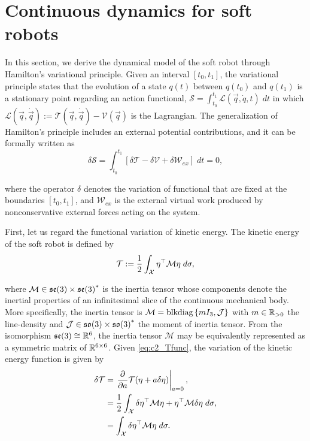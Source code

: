 \section*{Continuous dynamics for soft robots}
In this section, we derive the dynamical model of the soft robot through Hamilton's variational principle. Given an interval $[t_0,t_1]$, the variational principle states that the evolution of a state $q(t)$ between $q(t_0)$ and $q(t_1)$ is a stationary point regarding an action functional, $\mathcal{S} = \int_{t_0}^{t_1} \mathcal{L}(\vec{q},\dot{q},t) \; dt$ in which $\mathcal{L}(\vec{q},\dot{\vec{q}}) := \mathcal{T}(\vec{q},\dot{\vec{q}}) - \mathcal{V}(\vec{q})$ is the Lagrangian. The generalization of Hamilton's principle \cite{Boyer2010} includes an external potential contributions, and it can be formally written as
\begin{equation} 
\delta\mathcal{S} = \int_{t_0}^{t_1} \left[\delta\mathcal{T} - \delta\mathcal{V} + \delta\mathcal{W}_{ex} \right]\; dt = 0,
\label{eq:varprinc}
\end{equation}

\noindent where the operator $\delta$ denotes the variation of functional that are fixed at the boundaries $[t_0,t_1]$, and $\mathcal{W}_{ex}$ is the external virtual work produced by nonconservative external forces acting on the system. 

First, let us regard the functional variation of kinetic energy. The kinetic energy of the soft robot is defined by  
\begin{equation}
\mathcal{T} := \frac{1}{2}\int_{\mathcal{X}} {\eta}^\top \mathcal{M} {\eta}\;d\sigma, \label{eq:c2_Tfunc} 
\end{equation}

\noindent where $\mathcal{M} \in {\mathfrak{se}(3)} \times {\mathfrak{se}(3)}^* $ is the inertia tensor whose components denote the inertial properties of an infinitesimal slice of the continuous mechanical body. More specifically, the inertia tensor is $\mathcal{M} = \textnormal{blkdiag}\left\{ {mI_3,\mathcal{J}} \right\}$ with $m \in \operatorname{\mathbb{R}_{>0}}$ the line-density and $\mathcal{J} \in {\mathfrak{so}(3)} \times {\mathfrak{so}(3)}^* $ the moment of inertia tensor. From the isomorphism ${\mathfrak{se}(3)} \cong \mathbb{R}^6$, the inertia tensor $\mathcal{M}$ may be equivalently represented as a symmetric matrix of $\mathbb{R}^{6\times6}$. Given \eqref{eq:c2_Tfunc}, the variation of the kinetic energy function is given by 
\begin{align}
\delta\mathcal{T} & = \left. \frac{\partial }{\partial a} \mathcal{T}({\eta} + a \delta{\eta}) \right|_{a = 0}, \notag \\
& = \frac{1}{2} \int_{\mathcal{X}} \delta{\eta}^\top \mathcal{M}  {\eta} + {\eta}^\top \mathcal{M} \delta{\eta} \; d\sigma, \notag \\
& = \int_{\mathcal{X}} \delta{\eta}^\top \mathcal{M}  {\eta} \; d\sigma. \label{eq:c2_varham_T}
\end{align}

